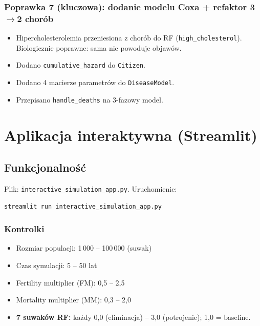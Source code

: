 \documentclass[11pt,a4paper]{article}
\begin{document}
\subsubsection{Poprawka 7 (kluczowa): dodanie modelu Coxa + refaktor 3$\to$2 chorób}

\begin{itemize}
  \item Hipercholesterolemia przeniesiona z chorób do RF (\texttt{high\_cholesterol}). Biologicznie poprawne: sama nie powoduje objawów.
  \item Dodano \texttt{cumulative\_hazard} do \texttt{Citizen}.
  \item Dodano 4 macierze parametrów do \texttt{DiseaseModel}.
  \item Przepisano \texttt{handle\_deaths} na 3-fazowy model.
\end{itemize}

\newpage
\section{Aplikacja interaktywna (Streamlit)}

\subsection{Funkcjonalność}

Plik: \texttt{interactive\_simulation\_app.py}. Uruchomienie:
\begin{lstlisting}[language=bash]
streamlit run interactive_simulation_app.py
\end{lstlisting}

\subsubsection{Kontrolki}

\begin{itemize}[leftmargin=*]
  \item Rozmiar populacji: 1\,000 -- 100\,000 (suwak)
  \item Czas symulacji: 5 -- 50 lat
  \item Fertility multiplier (FM): 0{,}5 -- 2{,}5
  \item Mortality multiplier (MM): 0{,}3 -- 2{,}0
  \item \textbf{7 suwaków RF:} każdy 0{,}0 (eliminacja) -- 3{,}0 (potrojenie); 1{,}0 = baseline.
\end{itemize}
\end{document}
